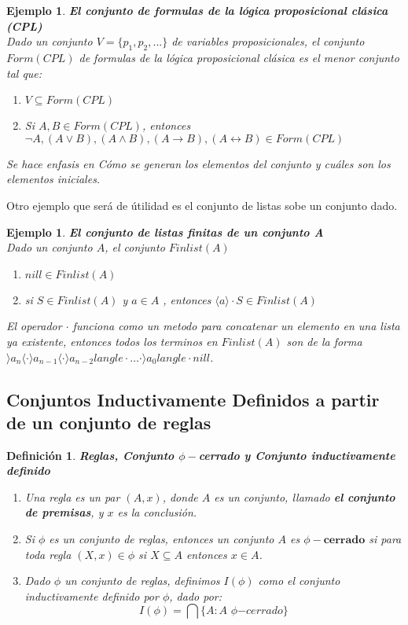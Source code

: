 \documentclass[executivepaper]{article}
\newtheorem{defi}[propo]{Definición}
\newtheorem{ejemplo}[propo]{Ejemplo}
\begin{document}
\begin{ejemplo}\textbf{El conjunto de formulas de la lógica proposicional clásica (CPL)}\\
    Dado un conjunto $V = \{p_1, p_2,...\}$ de \emph{variables proposicionales}, el conjunto $Form(CPL)$ de \emph{formulas de la lógica proposicional clásica} es el menor conjunto tal que:
    \begin{enumerate}
        \item $V \subseteq Form(CPL)$
        \item Si $A, B \in Form(CPL)$, entonces $\neg A, (A \lor B), (A \land B), (A \rightarrow B), (A \leftrightarrow B) \in Form(CPL)$
    \end{enumerate}
    Se hace enfasis en \emph{Cómo} se generan los elementos del conjunto y cuáles son los elementos iniciales.
\end{ejemplo}

Otro ejemplo que será de útilidad es el conjunto de listas sobe un conjunto dado.
\begin{ejemplo}\textbf{El conjunto de listas finitas de un conjunto A}\\
    Dado un conjunto $A$, el conjunto $Finlist(A)$
    \begin{enumerate}
        \item $nill \in Finlist(A)$
        \item si $S \in Finlist(A)$ y $a \in A$ , entonces $\langle a \rangle\cdot S\in Finlist(A)$
    \end{enumerate}
El operador $\cdot$ funciona como un metodo para concatenar un elemento en una lista ya existente, entonces todos los terminos en $Finlist(A)$ son de la forma $\rangle a_n\langle \cdot\rangle a_{n-1} \langle\cdot\rangle a_{n-2}langle\cdot\ldots\cdot\rangle a_{0}langle\cdot nill$.
\end{ejemplo}

\subsection{Conjuntos Inductivamente Definidos a partir de un conjunto de reglas}
\begin{defi}
\textbf{Reglas, Conjunto $\phi-$cerrado y Conjunto inductivamente definido}
\begin{enumerate}
\item Una regla es un par $(A,x)$, donde $A$ es un conjunto, llamado \textbf{el conjunto de premisas}, y $x$ es la conclusión.
\item Si $\phi$ es un conjunto de reglas, entonces un conjunto $A$ es $\phi - \textbf{cerrado}$ si para toda regla $(X,x) \in \phi$ si $X \subseteq A$ entonces $x \in A$.
\item Dado $\phi$ un conjunto de reglas, definimos $I(\phi)$ como el conjunto inductivamente definido por $\phi$, dado por:
$$I(\phi) = \bigcap \{A : A \,\,\phi{-cerrado}\}$$
\end{enumerate}
\end{defi}
\end{document}
